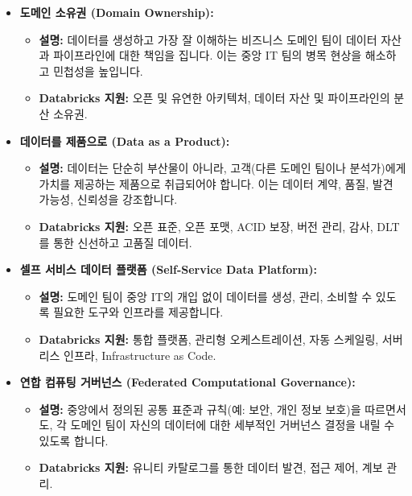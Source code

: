 \documentclass[11pt,a4paper]{article}
\begin{document}
\begin{tcolorbox}[title=\textbf{데이터 메시의 4가지 핵심 원칙}, colback=orange!5!white, colframe=orange!75!black, sharp corners, boxrule=0.8pt]
\begin{itemize}
    \item \textbf{도메인 소유권 (Domain Ownership):}
    \begin{itemize}
        \item \textbf{설명:} 데이터를 생성하고 가장 잘 이해하는 비즈니스 도메인 팀이 데이터 자산과 파이프라인에 대한 책임을 집니다. 이는 중앙 IT 팀의 병목 현상을 해소하고 민첩성을 높입니다.
        \item \textbf{Databricks 지원:} 오픈 및 유연한 아키텍처, 데이터 자산 및 파이프라인의 분산 소유권.
    \end{itemize}
    \item \textbf{데이터를 제품으로 (Data as a Product):}
    \begin{itemize}
        \item \textbf{설명:} 데이터는 단순히 부산물이 아니라, 고객(다른 도메인 팀이나 분석가)에게 가치를 제공하는 제품으로 취급되어야 합니다. 이는 데이터 계약, 품질, 발견 가능성, 신뢰성을 강조합니다.
        \item \textbf{Databricks 지원:} 오픈 표준, 오픈 포맷, ACID 보장, 버전 관리, 감사, DLT를 통한 신선하고 고품질 데이터.
    \end{itemize}
    \item \textbf{셀프 서비스 데이터 플랫폼 (Self-Service Data Platform):}
    \begin{itemize}
        \item \textbf{설명:} 도메인 팀이 중앙 IT의 개입 없이 데이터를 생성, 관리, 소비할 수 있도록 필요한 도구와 인프라를 제공합니다.
        \item \textbf{Databricks 지원:} 통합 플랫폼, 관리형 오케스트레이션, 자동 스케일링, 서버리스 인프라, Infrastructure as Code.
    \end{itemize}
    \item \textbf{연합 컴퓨팅 거버넌스 (Federated Computational Governance):}
    \begin{itemize}
        \item \textbf{설명:} 중앙에서 정의된 공통 표준과 규칙(예: 보안, 개인 정보 보호)을 따르면서도, 각 도메인 팀이 자신의 데이터에 대한 세부적인 거버넌스 결정을 내릴 수 있도록 합니다.
        \item \textbf{Databricks 지원:} 유니티 카탈로그를 통한 데이터 발견, 접근 제어, 계보 관리.
    \end{itemize}
\end{itemize}
\end{tcolorbox}
\end{document}
